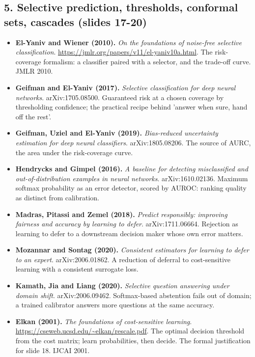 \documentclass[11pt,letterpaper]{article}
\begin{document}
\subsection*{5. Selective prediction, thresholds, conformal sets, cascades (slides 17-20)}
\begin{itemize}[leftmargin=1.2em,itemsep=3pt]\sloppy
\item \textbf{El-Yaniv and Wiener (2010).} \textit{On the foundations of noise-free selective classification}. \url{https://jmlr.org/papers/v11/el-yaniv10a.html}. The risk-coverage formalism: a classifier paired with a selector, and the trade-off curve. JMLR 2010.
\item \textbf{Geifman and El-Yaniv (2017).} \textit{Selective classification for deep neural networks}. arXiv:1705.08500. Guaranteed risk at a chosen coverage by thresholding confidence; the practical recipe behind 'answer when sure, hand off the rest'.
\item \textbf{Geifman, Uziel and El-Yaniv (2019).} \textit{Bias-reduced uncertainty estimation for deep neural classifiers}. arXiv:1805.08206. The source of AURC, the area under the risk-coverage curve.
\item \textbf{Hendrycks and Gimpel (2016).} \textit{A baseline for detecting misclassified and out-of-distribution examples in neural networks}. arXiv:1610.02136. Maximum softmax probability as an error detector, scored by AUROC: ranking quality as distinct from calibration.
\item \textbf{Madras, Pitassi and Zemel (2018).} \textit{Predict responsibly: improving fairness and accuracy by learning to defer}. arXiv:1711.06664. Rejection as learning to defer to a downstream decision maker whose own error matters.
\item \textbf{Mozannar and Sontag (2020).} \textit{Consistent estimators for learning to defer to an expert}. arXiv:2006.01862. A reduction of deferral to cost-sensitive learning with a consistent surrogate loss.
\item \textbf{Kamath, Jia and Liang (2020).} \textit{Selective question answering under domain shift}. arXiv:2006.09462. Softmax-based abstention fails out of domain; a trained calibrator answers more questions at the same accuracy.
\item \textbf{Elkan (2001).} \textit{The foundations of cost-sensitive learning}. \url{https://cseweb.ucsd.edu/~elkan/rescale.pdf}. The optimal decision threshold from the cost matrix; learn probabilities, then decide. The formal justification for slide 18. IJCAI 2001.

\end{itemize}
\end{document}
